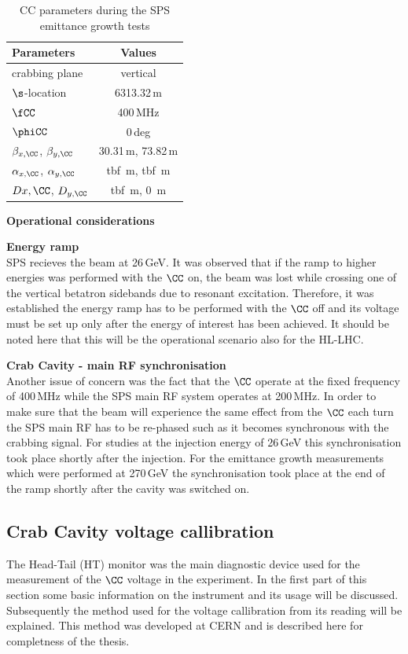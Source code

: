 \begin{table}[!hbt]
   \centering
   \caption{CC parameters during the SPS emittance growth tests}
   \begin{tabular}{lc}
       \toprule
       \textbf{Parameters} & \textbf{Values}\\
       \bottomrule
       crabbing plane & vertical \\
       $\s$-location & 6313.32\,m \\
      $\fCC$  & 400\,MHz   \\ 
      $\phiCC$  & 0\,deg   \\ 
      \bottomrule
      $\beta_{x, \CC}$, $\beta_{y, \CC}$  & 30.31\,m,  73.82\,m \\
      $\alpha_{x, \CC}$, $\alpha_{y, \CC}$  & tbf \,m,  tbf \,m \\
      $D{x, \CC}$, $D_{y, \CC}$  & tbf \,m,  0 \,m \\     
      \bottomrule
   \end{tabular}
   \label{tab:SPS_CCs}
\end{table}

\large{\textbf{Operational considerations}}

\normalsize{\textbf{Energy ramp}}\\
SPS recieves the beam at 26\,GeV. It was observed that if the ramp to higher energies was performed with the $\CC$ on, the beam was lost while crossing one of the vertical betatron sidebands due to resonant excitation. Therefore, it was established the energy ramp has to be performed with the $\CC$ off and its voltage must be set up only after the energy of interest has been achieved. It should be noted here that this will be the operational scenario also for the HL-LHC.

\normalsize{\textbf{Crab Cavity - main RF synchronisation}}\\
Another issue of concern was the fact that the $\CC$ operate at the fixed frequency of 400\,MHz while the SPS main RF system operates at 200\,MHz.
In order to make sure that the beam will experience the same effect from the $\CC$ each turn the SPS main RF has to be re-phased such as it becomes synchronous with the crabbing signal. For studies at the injection energy of 26\,GeV this synchronisation took place shortly after the injection. For the emittance growth measurements which were performed at 270\,GeV the synchronisation took place at the end of the ramp shortly after the cavity was switched on.

\subsection{Crab Cavity voltage callibration}
The Head-Tail (HT) monitor was the main diagnostic device used for the measurement of the $\CC$ voltage in the experiment. In the first part of this section some basic information on the instrument and its usage will be discussed. Subsequently the method used for the voltage callibration from its reading will be explained. This method was developed at CERN and is described here for completness of the thesis.

